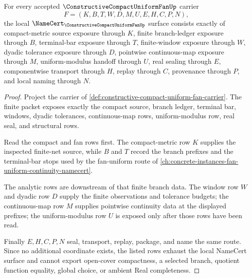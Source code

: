 \begin{theorem}
\label{thm:constructive-compact-uniform-fan-namecert-obligations}
For every accepted $\ConstructiveCompactUniformFanUp$ carrier
$$
F=(K,B,T,W,D,M,U,E,H,C,P,N),
$$
the local $\NameCert_{\ConstructiveCompactUniformFanUp}$ surface consists exactly of compact-metric source exposure through $K$, finite branch-ledger exposure through $B$, terminal-bar exposure through $T$, finite-window exposure through $W$, dyadic tolerance exposure through $D$, pointwise continuous-map exposure through $M$, uniform-modulus handoff through $U$, real sealing through $E$, componentwise transport through $H$, replay through $C$, provenance through $P$, and local naming through $N$.
\end{theorem}
\begin{proof}
Project the carrier of \autoref{def:constructive-compact-uniform-fan-carrier}. The finite packet exposes exactly the compact source, branch ledger, terminal bar, windows, dyadic tolerances, continuous-map rows, uniform-modulus row, real seal, and structural rows.

Read the compact and fan rows first. The compact-metric row $K$ supplies the inspected finite-net source, while $B$ and $T$ record the branch prefixes and the terminal-bar stops used by the fan-uniform route of \autoref{ch:concrete-instances-fan-uniform-continuity-namecert}.

The analytic rows are downstream of that finite branch data. The window row $W$ and dyadic row $D$ supply the finite observations and tolerance budgets; the continuous-map row $M$ supplies pointwise continuity data at the displayed prefixes; the uniform-modulus row $U$ is exposed only after those rows have been read.

Finally $E,H,C,P,N$ seal, transport, replay, package, and name the same route. Since no additional coordinate exists, the listed rows exhaust the local NameCert surface and cannot export open-cover compactness, a selected branch, quotient function equality, global choice, or ambient Real completeness.
\end{proof}

